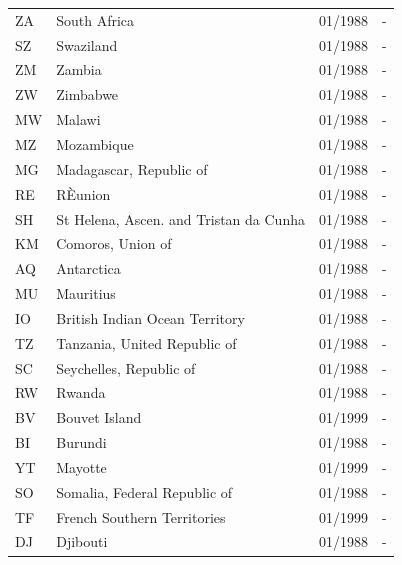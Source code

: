 \begin{footnotesize}
\begin{longtable}{p{0.5cm}p{9cm}p{2cm}p{2cm}}
ZA	&	South Africa	&	01/1988	&	-	\\

SZ	&	Swaziland	&	01/1988	&	-	\\

ZM	&	Zambia	&	01/1988	&	-	\\

ZW	&	Zimbabwe	&	01/1988	&	-	\\

MW	&	Malawi	&	01/1988	&	-	\\

MZ	&	Mozambique	&	01/1988	&	-	\\

MG	&	Madagascar, Republic of	&	01/1988	&	-	\\

RE	&	RÈunion	&	01/1988	&	-	\\

SH	&	St Helena, Ascen. and Tristan da Cunha	&	01/1988	&	-	\\

KM	&	Comoros, Union of	&	01/1988	&	-	\\

AQ	&	Antarctica	&	01/1988	&	-	\\

MU	&	Mauritius	&	01/1988	&	-	\\

IO	&	British Indian Ocean Territory	&	01/1988	&	-	\\

TZ	&	Tanzania, United Republic of	&	01/1988	&	-	\\

SC	&	Seychelles, Republic of	&	01/1988	&	-	\\

RW	&	Rwanda	&	01/1988	&	-	\\

BV	&	Bouvet Island	&	01/1999	&	-	\\

BI	&	Burundi	&	01/1988	&	-	\\

YT	&	Mayotte	&	01/1999	&	-	\\

SO	&	Somalia, Federal Republic of	&	01/1988	&	-	\\

TF	&	French Southern Territories	&	01/1999	&	-	\\

DJ	&	Djibouti	&	01/1988	&	-	\\


\end{longtable}
\end{footnotesize}
